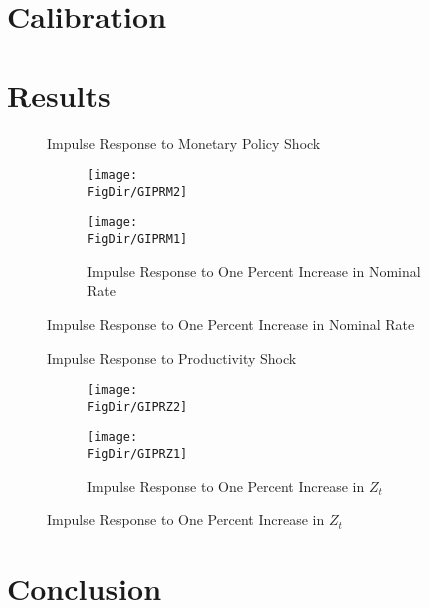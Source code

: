 \documentclass[titlepage]{\econtex}\providecommand{\texname}{BufferStockTheory}
\providecommand{\FigDir}{Figures}
\providecommand{\TableDir}{Tables}
\begin{document}
\hypertarget{Calibration}{}
\section{Calibration}








\hypertarget{Results}{}
\section{Results}

\begin{figure}{Impulse Response to Monetary Policy Shock}
  \begin{subfigure}{}
    \centering\texttt{[image: \\FigDir/GIPRM2]}
  \end{subfigure}
  \begin{subfigure}{}
    \centering\texttt{[image: \\FigDir/GIPRM1]}
    \caption{ Impulse Response to One Percent Increase in Nominal Rate}
  \end{subfigure}
\end{figure}

\begin{figure}{Impulse Response to Productivity Shock}
  \begin{subfigure}{}
    \centering\texttt{[image: \\FigDir/GIPRZ2]}
  \end{subfigure}
  \begin{subfigure}{}
    \centering\texttt{[image: \\FigDir/GIPRZ1]}
    \caption{ Impulse Response to One Percent Increase in $Z_{t}$}
  \end{subfigure}
\end{figure}



\hypertarget{Conclusion}{}
\section{Conclusion}




















\end{document}
